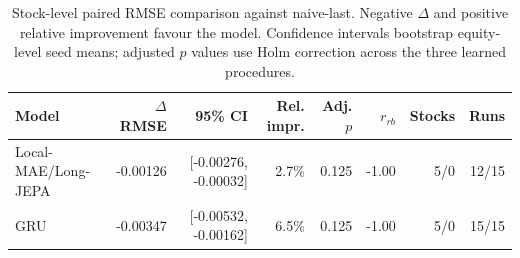 \begin{table}[t]
\centering
\small
\caption{Stock-level paired RMSE comparison against naive-last. Negative $\Delta$ and positive relative improvement favour the model. Confidence intervals bootstrap equity-level seed means; adjusted $p$ values use Holm correction across the three learned procedures.}
\label{tab:paired_rmse_naive}
\begin{tabular}{lrrrrrrr}
\toprule
Model & $\Delta$RMSE & 95\% CI & Rel. impr. & Adj. $p$ & $r_{rb}$ & Stocks & Runs \\
\midrule
Local-MAE/Long-JEPA & -0.00126 & [-0.00276, -0.00032] & 2.7\% & 0.125 & -1.00 & 5/0 & 12/15 \\
GRU & -0.00347 & [-0.00532, -0.00162] & 6.5\% & 0.125 & -1.00 & 5/0 & 15/15 \\
\bottomrule
\end{tabular}
\end{table}
